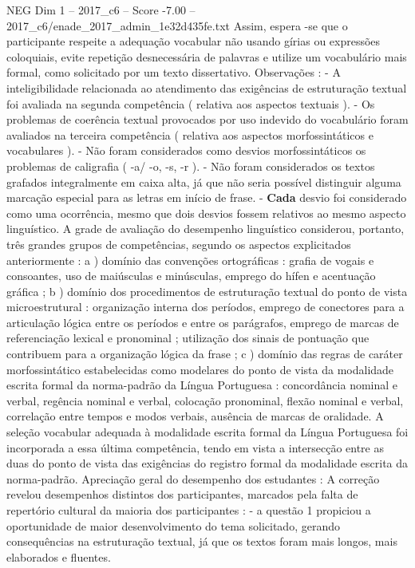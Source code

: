 \begin{textsample}{NEG Dim 1 – 2017\_c6 – Score -7.00 – 2017\_c6/enade\_2017\_admin\_1e32d435fe.txt}
Assim, espera -se que o participante respeite a adequação vocabular não usando gírias ou expressões coloquiais, evite repetição desnecessária de palavras e utilize um vocabulário mais formal, como solicitado por um texto dissertativo.
Observações : - A inteligibilidade relacionada ao atendimento das exigências de estruturação textual foi avaliada na segunda competência ( relativa aos aspectos textuais ). - Os problemas de coerência textual provocados por uso indevido do vocabulário foram avaliados na terceira competência ( relativa aos aspectos morfossintáticos e vocabulares ). - Não foram considerados como desvios morfossintáticos os problemas de caligrafia ( -a/ -o, -s, -r ). - Não foram considerados os textos grafados integralmente em caixa alta, já que não seria possível distinguir alguma marcação especial para as letras em início de frase. - \textbf{Cada} desvio foi considerado como uma ocorrência, mesmo que dois desvios fossem relativos ao mesmo aspecto linguístico.
A grade de avaliação do desempenho linguístico considerou, portanto, três grandes grupos de competências, segundo os aspectos explicitados anteriormente : a ) domínio das convenções ortográficas : grafia de vogais e consoantes, uso de maiúsculas e minúsculas, emprego do hífen e acentuação gráfica ; b ) domínio dos procedimentos de estruturação textual do ponto de vista microestrutural : organização interna dos períodos, emprego de conectores para a articulação lógica entre os períodos e entre os parágrafos, emprego de marcas de referenciação lexical e pronominal ; utilização dos sinais de pontuação que contribuem para a organização lógica da frase ; c ) domínio das regras de caráter morfossintático estabelecidas como modelares do ponto de vista da modalidade escrita formal da norma-padrão da Língua Portuguesa : concordância nominal e verbal, regência nominal e verbal, colocação pronominal, flexão nominal e verbal, correlação entre tempos e modos verbais, ausência de marcas de oralidade.
A seleção vocabular adequada à modalidade escrita formal da Língua Portuguesa foi incorporada a essa última competência, tendo em vista a intersecção entre as duas do ponto de vista das exigências do registro formal da modalidade escrita da norma-padrão.
Apreciação geral do desempenho dos estudantes : A correção revelou desempenhos distintos dos participantes, marcados pela falta de repertório cultural da maioria dos participantes : - a questão 1 propiciou a oportunidade de maior desenvolvimento do tema solicitado, gerando consequências na estruturação textual, já que os textos foram mais longos, mais elaborados e fluentes.

\end{textsample}

